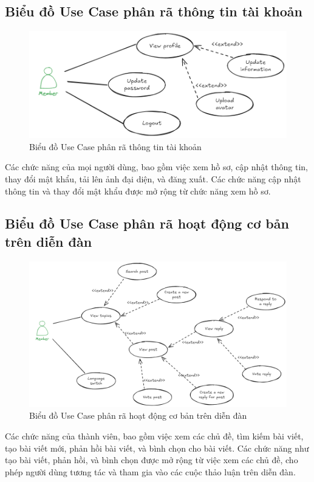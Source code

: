 \documentclass[../index.tex]{subfiles}
\begin{document}
    \subsection{Biểu đồ Use Case phân rã thông tin tài khoản}
    \begin{figure}[H]
        \centering
        \includegraphics[width=0.85\linewidth]{
            figures/usecase-account-setting.png
        }
        \caption{Biểu đồ Use Case phân rã thông tin tài khoản}
    \end{figure}
    Các chức năng của mọi người dùng, bao gồm việc xem hồ sơ, cập nhật thông tin,
    thay đổi mật khẩu, tải lên ảnh đại diện, và đăng xuất. Các chức năng cập nhật
    thông tin và thay đổi mật khẩu được mở rộng từ chức năng xem hồ sơ.

    \subsection{Biểu đồ Use Case phân rã hoạt động cơ bản trên diễn đàn}
    \begin{figure}[H]
        \centering
        \includegraphics[width=0.85\linewidth]{
            figures/usecase-basic-activity.png
        }
        \caption{Biểu đồ Use Case phân rã hoạt động cơ bản trên diễn đàn}
    \end{figure}
    Các chức năng của thành viên, bao gồm việc xem các chủ đề, tìm kiếm bài viết,
    tạo bài viết mới, phản hồi bài viết, và bình chọn cho bài viết. Các chức năng
    như tạo bài viết, phản hồi, và bình chọn được mở rộng từ việc xem các chủ đề,
    cho phép người dùng tương tác và tham gia vào các cuộc thảo luận trên diễn
    đàn.
\end{document}
